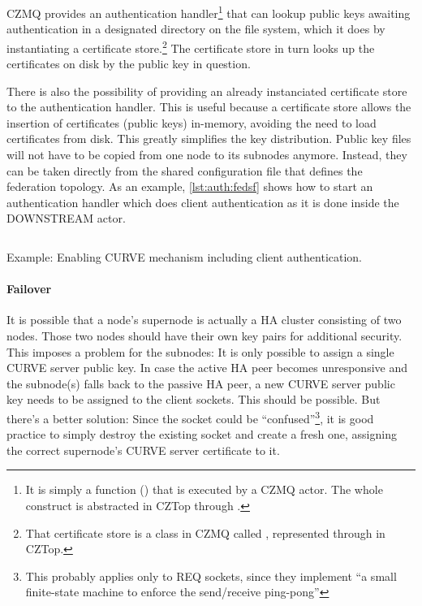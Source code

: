 CZMQ provides an authentication handler\footnote{It is simply a function
() that is executed by a CZMQ actor. The whole construct is
abstracted in CZTop through .} that can lookup public
keys awaiting authentication in a designated directory on the file system,
which it does by instantiating a certificate store.\footnote{That certificate
store is a class in CZMQ called , represented through
 in CZTop.} The certificate store in turn looks up the
certificates on disk by the public key in question.

There is also the possibility of providing an already instanciated certificate
store to the authentication handler. This is useful because a certificate store
allows the insertion of certificates (public keys) in-memory, avoiding the need
to load certificates from disk. This greatly simplifies the key distribution.
Public key files will not have to be copied from one node to its subnodes
anymore. Instead, they can be taken directly from the shared configuration file
that defines the federation topology. As an example, \autoref{lst:auth:fedsf}
shows how to start an authentication handler which does client authentication
as it is done inside the DOWNSTREAM actor.

\begin{listing}
	\inputminted[bgcolor=bg]{Ruby}{listings/auth/fedsf.rb}
	\caption{Example: Enabling CURVE mechanism including client authentication.}
	\label{lst:auth:fedsf}
\end{listing}

\paragraph{Failover}\label{sec:approach:encryption:ha}
It is possible that a node's supernode is actually a HA cluster consisting of
two nodes. Those two nodes should have their own key pairs for additional
security. This imposes a problem for the subnodes: It is only possible to assign
a single CURVE server public key. In case the active HA peer becomes
unresponsive and the subnode(s) falls back to the passive HA peer, a new CURVE
server public key needs to be assigned to the client sockets. This should be
possible. But there's a better solution:
Since the socket could be \cite[Binary Star Implementation, Binary Star client
in C]{zmq:zguide} ``confused''\footnote{This probably applies only to REQ
sockets, since they implement \cite[Client-Side Reliability (Lazy Pirate
Pattern)]{zmq:zguide} ``a small finite-state machine to enforce the
send/receive ping-pong''}, it is good practice to simply destroy the existing
socket and create a fresh one, assigning the correct supernode's CURVE server
certificate to it.

